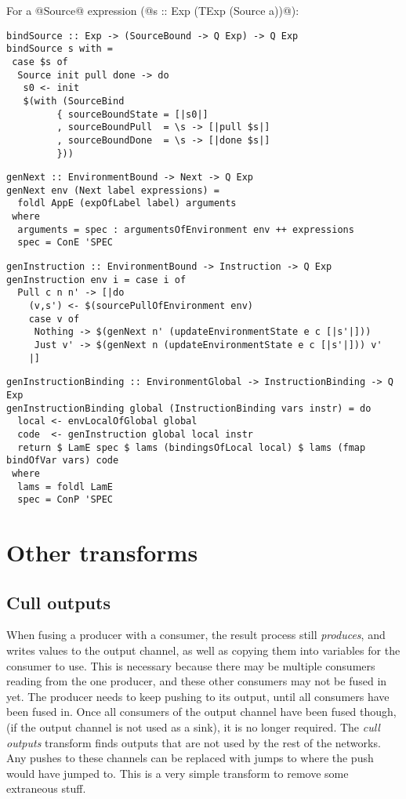 For a @Source@ expression (@s :: Exp (TExp (Source a))@):
\begin{lstlisting}
bindSource :: Exp -> (SourceBound -> Q Exp) -> Q Exp
bindSource s with =
 case $s of
  Source init pull done -> do
   s0 <- init
   $(with (SourceBind
         { sourceBoundState = [|s0|]
         , sourceBoundPull  = \s -> [|pull $s|]
         , sourceBoundDone  = \s -> [|done $s|]
         }))
\end{lstlisting}

\begin{lstlisting}
genNext :: EnvironmentBound -> Next -> Q Exp
genNext env (Next label expressions) =
  foldl AppE (expOfLabel label) arguments
 where
  arguments = spec : argumentsOfEnvironment env ++ expressions
  spec = ConE 'SPEC
\end{lstlisting}

\begin{lstlisting}
genInstruction :: EnvironmentBound -> Instruction -> Q Exp
genInstruction env i = case i of
  Pull c n n' -> [|do
    (v,s') <- $(sourcePullOfEnvironment env)
    case v of
     Nothing -> $(genNext n' (updateEnvironmentState e c [|s'|]))
     Just v' -> $(genNext n (updateEnvironmentState e c [|s'|])) v'
    |]
\end{lstlisting}

\begin{lstlisting}
genInstructionBinding :: EnvironmentGlobal -> InstructionBinding -> Q Exp
genInstructionBinding global (InstructionBinding vars instr) = do
  local <- envLocalOfGlobal global
  code  <- genInstruction global local instr
  return $ LamE spec $ lams (bindingsOfLocal local) $ lams (fmap bindOfVar vars) code
 where
  lams = foldl LamE
  spec = ConP 'SPEC
\end{lstlisting}

\section{Other transforms}
\subsection{Cull outputs}
When fusing a producer with a consumer, the result process still \emph{produces}, and writes values to the output channel, as well as copying them into variables for the consumer to use.
This is necessary because there may be multiple consumers reading from the one producer, and these other consumers may not be fused in yet.
The producer needs to keep pushing to its output, until all consumers have been fused in.
Once all consumers of the output channel have been fused though, (if the output channel is not used as a sink), it is no longer required.
The \emph{cull outputs} transform finds outputs that are not used by the rest of the networks.
Any pushes to these channels can be replaced with jumps to where the push would have jumped to.
This is a very simple transform to remove some extraneous stuff.


